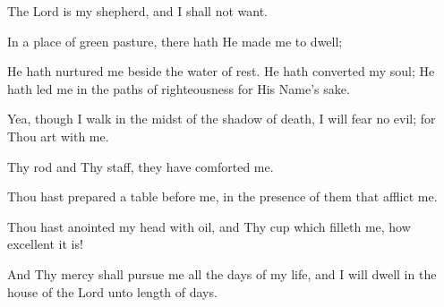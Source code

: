 The Lord is my shepherd, and I shall not want.

In a place of green pasture, there hath He made me to dwell;

He hath nurtured me beside the water of rest. He hath converted my soul; He hath led me in the paths of righteousness for His Name's sake.

Yea, though I walk in the midst of the shadow of death, I will fear no evil; for Thou art with me.

Thy rod and Thy staff, they have comforted me.

Thou hast prepared a table before me, in the presence of them that afflict me.

Thou hast anointed my head with oil, and Thy cup which filleth me, how excellent it is!

And Thy mercy shall pursue me all the days of my life, and I will dwell in the house of the Lord unto length of days.
